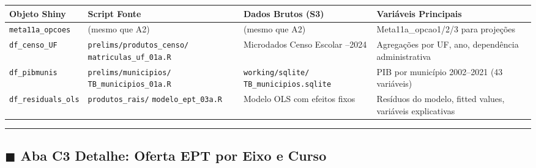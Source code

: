 \documentclass[10pt]{article}
\begin{document}
	\begin{center}
		\small
		\begin{tabular}{p{3.5cm}p{4.5cm}p{5cm}p{9cm}}
			\toprule
			\textbf{Objeto Shiny} & \textbf{Script Fonte} & \textbf{Dados Brutos (S3)} & \textbf{Variáveis Principais} \\
			\midrule
			\texttt{meta11a\_opcoes} & (mesmo que A2) & (mesmo que A2) & Meta11a\_opcao1/2/3 para projeções \\
			\texttt{df\_censo\_UF} & \texttt{prelims/produtos\_censo/} \newline \texttt{matriculas\_uf\_01a.R} & Microdados Censo Escolar \newline 2007--2024 & Agregações por UF, ano, dependência administrativa \\
			\texttt{df\_pibmunis} & \texttt{prelims/municipios/} \newline \texttt{TB\_municipios\_01a.R} & \texttt{working/sqlite/} \newline \texttt{TB\_municipios.sqlite} & PIB por município 2002--2021 (43 variáveis) \\
			\texttt{df\_residuals\_ols} & \texttt{produtos\_rais/} \newline \texttt{modelo\_ept\_03a.R} & Modelo OLS com efeitos fixos & Resíduos do modelo, fitted values, variáveis explicativas \\
			\bottomrule
		\end{tabular}
	\end{center}
	
	\vspace{0.8em}
	\hrule
	\vspace{0.8em}
	
	\subsection*{\textcolor{tabC}{$\blacksquare$} Aba C3 Detalhe: Oferta EPT por Eixo e Curso}
	
\end{document}
